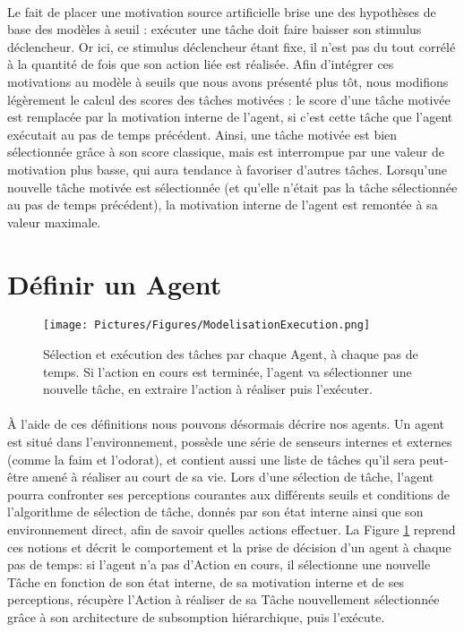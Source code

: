 			\paragraph{}
			Le fait de placer une motivation source artificielle brise une des hypothèses de base des modèles à seuil : exécuter une tâche doit faire baisser son stimulus déclencheur. Or ici, ce stimulus déclencheur étant fixe, il n'est pas du tout corrélé à la quantité de fois que son action liée est réalisée. Afin d'intégrer ces motivations au modèle à seuils que nous avons présenté plus tôt, nous modifions légèrement le calcul des scores des tâches motivées : le score d'une tâche motivée est remplacée par la motivation interne de l'agent, si c'est cette tâche que l'agent exécutait au pas de temps précédent. Ainsi, une tâche motivée est bien sélectionnée grâce à son score classique, mais est interrompue par une valeur de motivation plus basse, qui aura tendance à favoriser d'autres tâches. Lorsqu'une nouvelle tâche motivée est sélectionnée (et qu'elle n'était pas la tâche sélectionnée au pas de temps précédent), la motivation interne de l'agent est remontée à sa valeur maximale.
	
	\section{Définir un Agent}
	
	\begin{figure}
	\centering
	\texttt{[image: Pictures/Figures/ModelisationExecution.png]}
	\caption[Sélection et exécution des tâches par chaque Agent, à chaque pas de temps.]{Sélection et exécution des tâches par chaque Agent, à chaque pas de temps. Si l'action en cours est terminée, l'agent va sélectionner une nouvelle tâche, en extraire l'action à réaliser puis l'exécuter.}
	\label{agentExec}
	\end{figure}		
	
		\paragraph{}
		À l'aide de ces définitions nous pouvons désormais décrire nos agents. Un agent est situé dans l'environnement, possède une série de senseurs internes et externes (comme la faim et l'odorat), et contient aussi une liste de tâches qu'il sera peut-être amené à réaliser au court de sa vie. Lors d'une sélection de tâche, l'agent pourra confronter ses perceptions courantes aux différents seuils et conditions de l'algorithme de sélection de tâche, donnés par son état interne ainsi que son environnement direct, afin de savoir quelles actions effectuer. La Figure \ref{agentExec} reprend ces notions et décrit le comportement et la prise de décision d'un agent à chaque pas de temps: si l'agent n'a pas d'Action en cours, il sélectionne une nouvelle Tâche en fonction de son état interne, de sa motivation interne et de ses perceptions, récupère l'Action à réaliser de sa Tâche nouvellement sélectionnée grâce à son architecture de subsomption hiérarchique, puis l'exécute.
		
